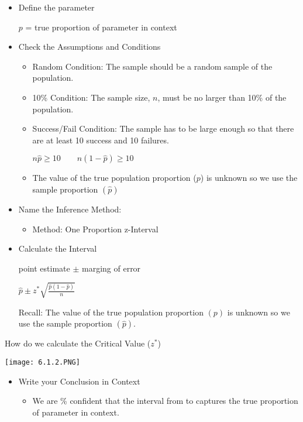 \documentclass[../stats.tex]{subfiles}
\begin{document}
\begin{itemize}
    \item Define the parameter 
    
    $p$ = true proportion of {parameter in context}

    \item Check the Assumptions and Conditions 
    \begin{itemize}
        \item Random Condition: The sample should be a random sample of the population.
        \item 10\% Condition: The sample size, $n$, must be no larger than 10\% of the population.
        \item Success/Fail Condition: The sample has to be large enough so that there are at least 10 success and 10 failures. 
        \begin{center}
            $n\hat{p}\geq 10 \qquad n(1-\hat{p})\geq 10$
        \end{center}
        \item The value of the true population proportion ($p$) is unknown so we use the sample proportion $(\hat{p})$
    \end{itemize}
    \item Name the Inference Method:
    \begin{itemize}
        \item Method: One Proportion z-Interval
    \end{itemize}
    \item Calculate the Interval 
    \begin{center}
        point estimate $\pm$ marging of error 

        $\hat{p}\pm z^*\sqrt{\frac{\hat{p}(1-\hat{p})}{n}}$
    \end{center}
    Recall: The value of the true population proportion $(p)$ is unknown so we use the sample proportion $(\hat{p})$.
\end{itemize}
How do we calculate the Critical Value ($z^*$)
\begin{center}
    \texttt{[image: 6.1.2.PNG]}
\end{center}
\begin{itemize}
    \item Write your Conclusion in Context 
    \begin{itemize}
        \item We are \blank \% confident that the interval from \blank to \blank captures the true proportion of {parameter in context}.
    \end{itemize}
\end{itemize}
\end{document}
